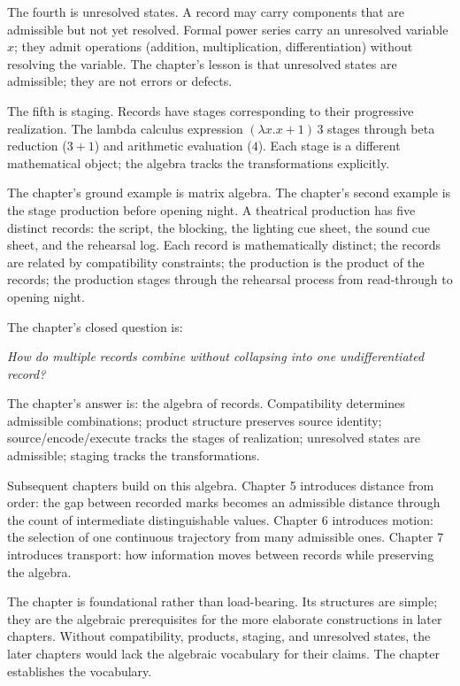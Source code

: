 \begin{chapteressay}
The fourth is unresolved states. A record may carry components that
are admissible but not yet resolved. Formal power series carry an
unresolved variable $x$; they admit operations (addition,
multiplication, differentiation) without resolving the variable.
The chapter's lesson is that unresolved states are admissible; they
are not errors or defects.

The fifth is staging. Records have stages corresponding to their
progressive realization. The lambda calculus expression $(\lambda x. x +
1) \, 3$ stages through beta reduction ($3 + 1$) and arithmetic
evaluation ($4$). Each stage is a different mathematical object;
the algebra tracks the transformations explicitly.

The chapter's ground example is matrix algebra. The chapter's
second example is the stage production before opening night. A
theatrical production has five distinct records: the script, the
blocking, the lighting cue sheet, the sound cue sheet, and the
rehearsal log. Each record is mathematically distinct; the records
are related by compatibility constraints; the production is the
product of the records; the production stages through the
rehearsal process from read-through to opening night.

The chapter's closed question is:

\begin{center}
\emph{How do multiple records combine without collapsing into one
undifferentiated record?}
\end{center}

The chapter's answer is: the algebra of records. Compatibility
determines admissible combinations; product structure preserves
source identity; source/encode/execute tracks the stages of
realization; unresolved states are admissible; staging tracks the
transformations.

Subsequent chapters build on this algebra. Chapter 5 introduces
distance from order: the gap between recorded marks becomes an
admissible distance through the count of intermediate
distinguishable values. Chapter 6 introduces motion: the
selection of one continuous trajectory from many admissible ones.
Chapter 7 introduces transport: how information moves between
records while preserving the algebra.

The chapter is foundational rather than load-bearing. Its
structures are simple; they are the algebraic prerequisites for
the more elaborate constructions in later chapters. Without
compatibility, products, staging, and unresolved states, the
later chapters would lack the algebraic vocabulary for their
claims. The chapter establishes the vocabulary.

\end{chapteressay}

